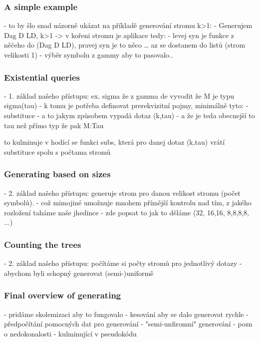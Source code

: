 \documentclass[a4paper,oneside]{memoir}
\begin{document}
\subsubsection{A simple example}

- to by šlo snad názorně ukázat na příkladě generování stromu k>1:
- Generujem Dag D LD, k>1 -> v kořeni stromu je aplikace tedy:
- levej syn je funkce z něčeho do (Dag D LD), pravej syn je to něco
… az se dostanem do listů (strom velikosti 1) - výběr symbolu z gammy aby to pasovalo..

\subsubsection{Existential queries}

- 1. základ našeho přístupu: ex. sigma že z gamma de vyvodit že M je typu sigma(tau)
  - k tomu je potřeba definovat prerekvizitní pojmy, minimálně tyto:
    - substituce
    - a to jakym způsobem vypadá dotaz (k,tau) - a že je teda obecnejší to tau než přímo typ že pak M:Tau

to kulminuje v hodící se funkci subs, která pro danej dotaz (k,tau) vrátí substituce spolu s počtama stromů


\subsubsection{Generating based on sizes}

- 2. základ našeho přístupu: generuje strom pro danou velikost stromu (počet symbolů).
  - což mimojiné umožnuje mnohem přímější kontrolu nad tím, z jakého rozložení taháme naše jhedince 
  - zde popsat to jak to děláme (32, 16,16, 8,8,8,8, ...)

\subsubsection{Counting the trees}

- 2. základ našeho přístupu: počítáme si počty stromů pro jednotlivý dotazy 
     - abychom byli schopný generovat (semi-)uniformě

\subsubsection{Final overview of generating}

- pridáme skolemizaci aby to fungovalo
- kesování aby se dalo generovat rychle
    - předpočítání pomocných dat pro generování
    - "semi-unfiromní" generování - pozn o nedokonalosti 
- kulminující v pseudokódu
\end{document}

